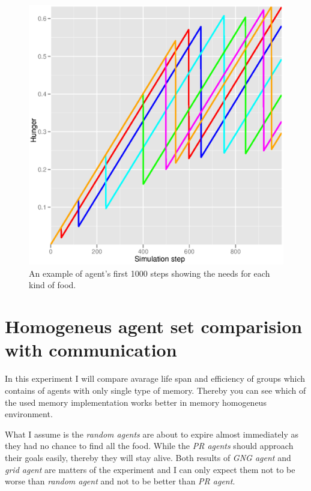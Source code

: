 \begin{figure}
  \centering                                
  \includegraphics[scale=0.4]{diagrams/experiments/single_agent.eps}    
  \caption{An example of agent's first 1000 steps showing the needs for each kind of food.}
  \label{experiments:singleagent}
\end{figure}

\section{Homogeneus agent set comparision with communication}

In this experiment I will compare avarage life span and efficiency of groups which contains of agents with only single type of memory. Thereby you can see which of the used memory implementation works better in memory homogeneus environment.

What I assume is the \emph{random agents} are about to expire almost immediately as they had no chance to find all the food. While the \emph{PR agents} should approach their goals easily, thereby they will stay alive. Both results of \emph{GNG agent} and \emph{grid agent} are matters of the experiment and I can only expect them not to be worse than \emph{random agent} and not to be better than \emph{PR agent}.     

